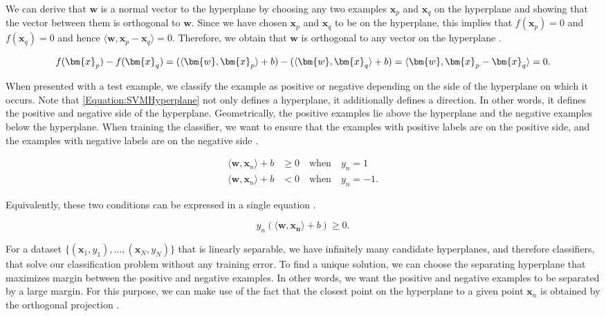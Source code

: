 \documentclass[../../../main.tex]{subfiles}
\begin{document}
We can derive that $\bm{w}$ is a normal vector to the hyperplane by choosing any two examples $\bm{x}_p$ and $\bm{x}_q$ on the hyperplane and showing that the vector between them is orthogonal to $\bm{w}$. Since we have chosen $\bm{x}_p$ and $\bm{x}_q$ to be on the hyperplane, this implies that $f(\bm{x}_p)=0$ and $f(\bm{x}_q)=0$ and hence $\langle\bm{w},\bm{x}_p-\bm{x}_q\rangle=0$. Therefore, we obtain that $\bm{w}$ is orthogonal to any vector on the hyperplane \autocite{Deisenroth2020}.

\begin{equation}
f(\bm{x}_p) - f(\bm{x}_q)
= (\langle\bm{w},\bm{x}_p\rangle + b) - (\langle\bm{w},\bm{x}_q\rangle + b) \\
= \langle\bm{w},\bm{x}_p-\bm{x}_q\rangle
= 0.
\end{equation}

When presented with a test example, we classify the example as positive or negative depending on the side of the hyperplane on which it occurs. Note that \autoref{Equation:SVMHyperplane} not only defines a hyperplane, it additionally defines a direction. In other words, it defines the positive and negative side of the hyperplane. Geometrically, the positive examples lie above the hyperplane and the negative examples below the hyperplane. When training the classifier, we want to ensure that the examples with positive labels are on the positive side, and the examples with negative labels are on the negative side \autocite{Deisenroth2020}.

\begin{align}
\langle\bm{w},\bm{x}_n\rangle+b &\geq 0 \quad \text{when} \quad y_n=1 \\
\langle\bm{w},\bm{x}_n\rangle+b &< 0 \quad \text{when} \quad y_n=-1.
\end{align}

Equivalently, these two conditions can be expressed in a single equation \autocite{Deisenroth2020}.

\begin{equation}
y_n(\langle\bm{w},\bm{x_n}\rangle+b)\geq0.
\end{equation}

For a dataset $\{(\bm{x}_1,y_1),\ldots,(\bm{x}_N,y_N)\}$ that is linearly separable, we have infinitely many candidate hyperplanes, and therefore classifiers, that solve our classification problem without any training error. To find a unique solution, we can choose the separating hyperplane that maximizes margin between the positive and negative examples. In other words, we want the positive and negative examples to be separated by a large margin. For this purpose, we can make use of the fact that the closest point on the hyperplane to a given point $\bm{x}_n$ is obtained by the orthogonal projection \autocite{Deisenroth2020}.
\end{document}
